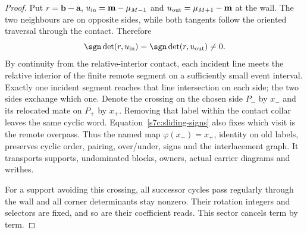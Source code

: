 \begin{proof}
Put $r=\mathbf b-\mathbf a$, $u_{\rm in}=\mathbf m-\mu_{M-1}$ and
$u_{\rm out}=\mu_{M+1}-\mathbf m$ at the wall.  The two neighbours are on opposite
sides, while both tangents follow the oriented traversal through the
contact.  Therefore
\begin{equation}\label{s7c:sliding-signs}
 \sgn\det(r,u_{\rm in})=\sgn\det(r,u_{\rm out})\ne0.
\end{equation}
By continuity from the relative-interior contact, each incident line
meets the relative interior of the finite remote segment on a sufficiently
small event interval.  Exactly one incident segment reaches that line
intersection on each side; the two sides exchange which one.  Denote
the crossing on the chosen side $P_-$ by $x_-$ and its relocated mate
on $P_+$ by $x_+$.  Removing that label within the contact collar
leaves the same cyclic word.  Equation~\eqref{s7c:sliding-signs} also
fixes which visit is the remote overpass.  Thus the named map
$\varphi(x_-)=x_+$, identity on old labels, preserves cyclic order,
pairing, over/under, signs and the interlacement graph.  It transports
supports, undominated blocks, owners, actual carrier diagrams and writhes.

For a support avoiding this crossing, all successor cycles pass regularly
through the wall and all corner determinants stay nonzero.  Their
rotation integers and selectors are fixed, and so are their coefficient
reads.  This sector cancels term by term.


\end{proof}

